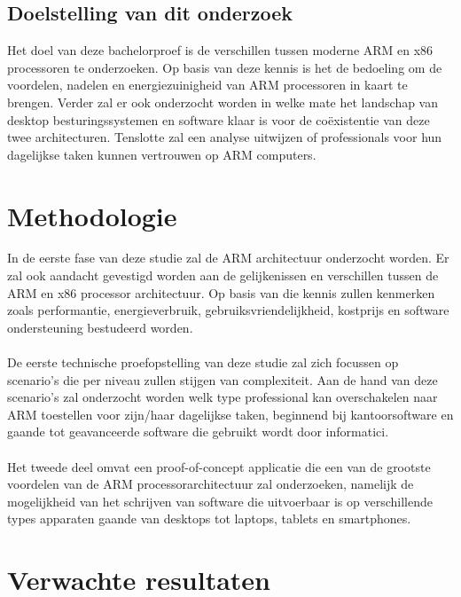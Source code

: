 \subsection{Doelstelling van dit onderzoek}
Het doel van deze bachelorproef is de verschillen tussen moderne ARM en x86 processoren te onderzoeken. Op basis van deze kennis is het de bedoeling om de voordelen, nadelen en energiezuinigheid van ARM processoren in kaart te brengen. Verder zal er ook onderzocht worden in welke mate het landschap van desktop besturingssystemen en software klaar is voor de coëxistentie van deze twee architecturen. Tenslotte zal een analyse uitwijzen of professionals voor hun dagelijkse taken kunnen vertrouwen op ARM computers.

\section{Methodologie}
\label{sec:methodologie}

In de eerste fase van deze studie zal de ARM architectuur onderzocht worden. Er zal ook aandacht gevestigd worden aan de gelijkenissen en verschillen tussen de ARM en x86 processor architectuur. Op basis van die kennis zullen kenmerken zoals performantie, energieverbruik, gebruiksvriendelijkheid, kostprijs en software ondersteuning bestudeerd worden. \\\\
De eerste technische proefopstelling van deze studie zal zich focussen op scenario's die per niveau zullen stijgen van complexiteit. Aan de hand van deze scenario's zal onderzocht worden welk type professional kan overschakelen naar ARM toestellen voor zijn/haar dagelijkse taken, beginnend bij kantoorsoftware en gaande tot geavanceerde software die gebruikt wordt door informatici. \\\\ 
Het tweede deel omvat een proof-of-concept applicatie die een van de grootste voordelen van de ARM processorarchitectuur zal onderzoeken, namelijk de mogelijkheid van het schrijven van software die uitvoerbaar is op verschillende types apparaten gaande van desktops tot laptops, tablets en smartphones.

\section{Verwachte resultaten}
\label{sec:verwachte_resultaten}

